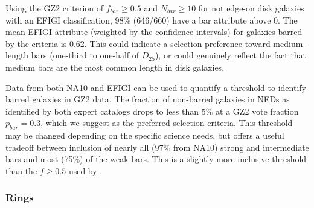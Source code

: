 \documentclass[useAMS,usenatbib]{mn2e}
\begin{document}
Using the \citet{mas11c} GZ2 criterion of $f_{bar}\geq0.5$ and $N_{bar}\geq10$ for not edge-on disk galaxies with an EFIGI classification, 98\% (646/660) have a bar attribute above 0. The mean EFIGI attribute (weighted by the confidence intervals) for galaxies barred by the \citet{mas11c} criteria is 0.62. This could indicate a selection preference toward medium-length bars (one-third to one-half of $D_{25}$), or could genuinely reflect the fact that medium bars are the most common length in disk galaxies. 

Data from both NA10 and EFIGI can be used to quantify a threshold to identify barred galaxies in GZ2 data. The fraction of non-barred galaxies in NEDs as identified by both expert catalogs drops to less than $5\%$ at a GZ2 vote fraction $p_{bar}=0.3$, which we suggest as the preferred selection criteria. This threshold may be changed depending on the specific science needs, but offers a useful tradeoff between inclusion of nearly all (97\% from NA10) strong and intermediate bars and most (75\%) of the weak bars. This is a slightly more inclusive threshold than the $f\geq0.5$ used by \citet{mas11c}.




\subsubsection{Rings}
\end{document}
